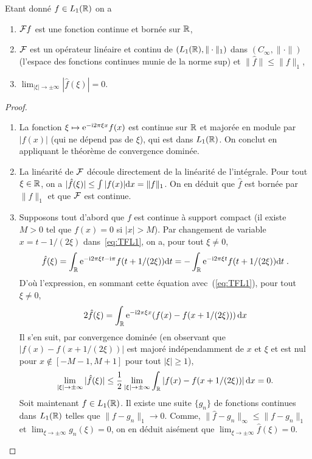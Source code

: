 \begin{theorem}
\label{thm:rieman-lebesgue}
Etant donn{\'e} $f \in L_1(\mathbb{R})$ on a
\begin{enumerate}
\item $\mathcal{F} f$ est une fonction continue et born{\'e}e sur $\mathbb{R}$,
\item $\mathcal{F}$ est un op{\'e}rateur lin{\'e}aire et continu de $(L_1(\mathbb{R}),\|\cdot\|_1)$ dans $(C_\infty,\|\cdot\|)$ (l'espace des
  fonctions continues munie de la norme sup) et $\| \hat{f} \| \leq \| f \|_1$,
\item $\lim_{|\xi| \to \pm \infty} |\hat{f}(\xi) |= 0 $.
\end{enumerate}
\end{theorem}
\begin{proof}
\begin{enumerate}
\item La fonction $\xi \mapsto \mathrm{e}^{- \mathrm{i} 2 \pi \xi x} f(x)$ est continue sur $\mathbb{R}$
  et major{\'e}e en module par $|f(x)|$ (qui ne d{\'e}pend pas de $\xi$), qui est dans $L_1(\mathbb{R})$. On conclut en appliquant le th\'eor\`eme de convergence domin\'ee.
\item La lin{\'e}arit{\'e} de $\mathcal{F}$ d{\'e}coule directement de la lin\'earit\'e de l'int{\'e}grale. Pour tout $\xi \in \mathbb{R}$, on a $|\hat{f}(\xi)| \leq
  \int |f(x)| \mathrm{d} x = \| f \|_1$. On en d{\'e}duit que $\hat{f}$ est born{\'e}e par $\| f\|_1$ et que $\mathcal{F}$ est continue.
\item Supposons tout d'abord que $f$ est continue {\`a} support compact (il existe $M>0$ tel que $f(x)=0$ si $|x|>M$). Par
  changement de variable $x=t-1/(2\xi)$ dans~\eqref{eq:TFL1}, on a, pour tout $\xi\neq0$,
$$
\hat{f}(\xi) = \int_{\mathbb{R}} \mathrm{e}^{- \mathrm{i} 2 \pi \xi t - \mathrm{i} \pi} f(t+1/(2\xi)) \mathrm{d} t =
- \int_{\mathbb{R}} \mathrm{e}^{- \mathrm{i} 2 \pi \xi t} f(t+1/(2\xi)) \mathrm{d} t \;.
$$
D'o{\`u} l'expression, en sommant cette {\'e}quation avec~(\ref{eq:TFL1}),  pour tout $\xi\neq0$,
$$
2 \hat{f}(\xi) = \int_{\mathbb{R}} \mathrm{e}^{- \mathrm{i} 2 \pi \xi x} (f(x)-f(x+1/(2\xi))) \,\mathrm{d} x
$$
Il s'en suit, par convergence domin{\'e}e (en observant que $|f(x)-f(x+1/(2\xi))|$ est major{\'e} ind{\'e}pendamment de $x$ et $\xi$ et
est nul pour $x\notin[-M-1,M+1]$ pour tout $|\xi|\geq1$),
$$
\lim_{|\xi| \to \pm \infty} |\hat{f}(\xi)| \leq \frac12 \lim_{|\xi| \to \pm \infty}
\int_{\mathbb{R}} |f(x)-f(x+1/(2\xi))| \,\mathrm{d} x = 0.
$$
Soit maintenant $f \in L_1(\mathbb{R})$. Il existe une suite $\{g_n\}$ de fonctions continues dans $L_1(\mathbb{R})$ telles que $\|f - g_n \|_1 \to 0$. Comme,
$\|\hat{f} - g_n\|_\infty \leq \| f - g_n \|_1$ et $\lim_{\xi \to \pm \infty} g_n(\xi) = 0$,
on en d{\'e}duit ais{\'e}ment que $\lim_{\xi  \to \pm \infty} \hat{f}(\xi)= 0$.
\end{enumerate}
\end{proof}


